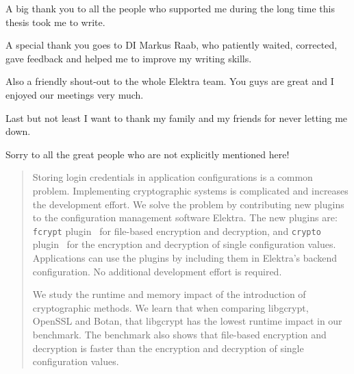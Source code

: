\documentclass[draft,final]{vutinfth} %
\newcommand{\crypto}[0]{{\texttt{crypto} plugin}} %
\newcommand{\fcrypt}[0]{{\texttt{fcrypt} plugin}} %
\begin{document}
\frontmatter %

\addstatementpage

\begin{acknowledgements*}
A big thank you to all the people who supported me during the long time this thesis took me to write.

A special thank you goes to DI Markus Raab, who patiently waited, corrected, gave feedback and helped me to improve my writing skills.

Also a friendly shout-out to the whole Elektra team.
You guys are great and I enjoyed our meetings very much.

Last but not least I want to thank my family and my friends for never letting me down.

Sorry to all the great people who are not explicitly mentioned here!
\end{acknowledgements*}

\begin{abstract}
Storing login credentials in application configurations is a common problem.
Implementing cryptographic systems is complicated and increases the development effort.
We solve the problem by contributing new plugins to the configuration management software Elektra.
The new plugins are: \fcrypt~ for file-based encryption and decryption, and \crypto~ for the encryption and decryption of single configuration values.
Applications can use the plugins by including them in Elektra's backend configuration.
No additional development effort is required.

We study the runtime and memory impact of the introduction of cryptographic methods.
We learn that when comparing libgcrypt, OpenSSL and Botan, that libgcrypt has the lowest runtime impact in our benchmark.
The benchmark also shows that file-based encryption and decryption is faster than the encryption and decryption of single configuration values.
\end{abstract}


\tableofcontents %

\mainmatter
\end{document}
